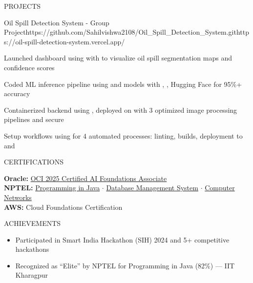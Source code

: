 \documentclass{resume}
\begin{document}
\begin{rSection}{PROJECTS}
\begin{rProject}{Oil Spill Detection System - Group Project}{https://github.com/Sahilvishwa2108/Oil_Spill_Detection_System.git}{https://oil-spill-detection-system.vercel.app/}
\item Launched dashboard using  with  to visualize oil spill segmentation maps and confidence scores
\item Coded ML inference pipeline using  and  models with , , Hugging Face for 95\%+ accuracy
\item Containerized backend using , deployed on  with 3 optimized image processing pipelines and secure 
\item Setup  workflows using  for 4 automated processes: linting, builds, deployment to  and 
\end{rProject}

\end{rSection}

\begin{rSection}{CERTIFICATIONS}

\textbf{Oracle:} \href{https://catalog-education.oracle.com/ords/certview/sharebadge?id=08DD03676BF6CB0DE9DA3D11E1F0F10FFE9F710A5961C592D02D1C3543E10050}{OCI 2025 Certified AI Foundations Associate} \\[1pt]
\textbf{NPTEL:} \href{https://archive.nptel.ac.in/content/noc/NOC25/SEM1/Ecertificates/106/noc25-cs57/Course/NPTEL25CS57S124280252304432710.pdf}{Programming in Java} $\cdot$ \href{https://archive.nptel.ac.in/content/noc/NOC25/SEM1/Ecertificates/106/noc25-cs18/Course/NPTEL25CS18S53880028401363129.pdf}{Database Management System} $\cdot$ \href{https://archive.nptel.ac.in/content/noc/NOC25/SEM2/Ecertificates/106/noc25-cs125/Course/NPTEL25CS125S63270046509160384.pdf}{Computer Networks} \\[1pt]
\textbf{AWS:} {Cloud Foundations Certification}

\end{rSection}

\begin{rSection}{ACHIEVEMENTS}

\begin{itemize}[leftmargin=12pt, itemsep=0pt, label={\small$\bullet$}]
\item Participated in Smart India Hackathon (SIH) 2024 and 5+ competitive hackathons
\item Recognized as ``Elite'' by NPTEL for Programming in Java (82\%) — IIT Kharagpur
\end{itemize}

\end{rSection}
\end{document}

